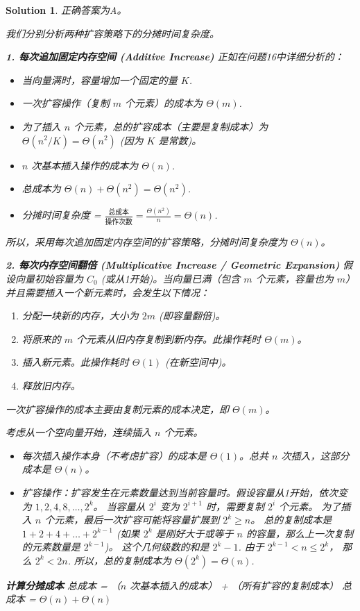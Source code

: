 \documentclass[UTF8]{report}
\newtheorem{solution}{Solution}
\theoremstyle{MyLineTheoremStyle} %
\theoremstyle{MyBlockTheoremStyle} %
\theoremstyle{MySubsubsectionStyle} %
\begin{document}
\begin{solution}
正确答案为A。

我们分别分析两种扩容策略下的分摊时间复杂度。

\textbf{1. 每次追加固定内存空间 (Additive Increase)}
正如在问题16中详细分析的：
\begin{itemize}
    \item 当向量满时，容量增加一个固定的量 $K$.
    \item 一次扩容操作（复制 $m$ 个元素）的成本为 $\Theta(m)$.
    \item 为了插入 $n$ 个元素，总的扩容成本（主要是复制成本）为 $\Theta(n^2/K) = \Theta(n^2)$ (因为 $K$ 是常数)。
    \item $n$ 次基本插入操作的成本为 $\Theta(n)$.
    \item 总成本为 $\Theta(n) + \Theta(n^2) = \Theta(n^2)$.
    \item 分摊时间复杂度 = $\frac{\text{总成本}}{\text{操作次数}} = \frac{\Theta(n^2)}{n} = \Theta(n)$.
\end{itemize}
所以，采用每次追加固定内存空间的扩容策略，分摊时间复杂度为 $\Theta(n)$。

\textbf{2. 每次内存空间翻倍 (Multiplicative Increase / Geometric Expansion)}
假设向量初始容量为 $C_0$ (或从1开始)。当向量已满（包含 $m$ 个元素，容量也为 $m$）并且需要插入一个新元素时，会发生以下情况：
\begin{enumerate}
    \item 分配一块新的内存，大小为 $2m$ (即容量翻倍)。
    \item 将原来的 $m$ 个元素从旧内存复制到新内存。此操作耗时 $\Theta(m)$。
    \item 插入新元素。此操作耗时 $\Theta(1)$ (在新空间中)。
    \item 释放旧内存。
\end{enumerate}
一次扩容操作的成本主要由复制元素的成本决定，即 $\Theta(m)$。

考虑从一个空向量开始，连续插入 $n$ 个元素。
\begin{itemize}
    \item 每次插入操作本身（不考虑扩容）的成本是 $\Theta(1)$。总共 $n$ 次插入，这部分成本是 $\Theta(n)$。
    \item 扩容操作：扩容发生在元素数量达到当前容量时。假设容量从1开始，依次变为 $1, 2, 4, 8, \dots, 2^k$。
    当容量从 $2^i$ 变为 $2^{i+1}$ 时，需要复制 $2^i$ 个元素。
    为了插入 $n$ 个元素，最后一次扩容可能将容量扩展到 $2^k \ge n$。
    总的复制成本是 $1 + 2 + 4 + \dots + 2^{k-1}$ (如果 $2^k$ 是刚好大于或等于 $n$ 的容量，那么上一次复制的元素数量是 $2^{k-1}$)。
    这个几何级数的和是 $2^k - 1$.
    由于 $2^{k-1} < n \le 2^k$， 那么 $2^k < 2n$.
    所以，总的复制成本为 $\Theta(2^k) = \Theta(n)$.
\end{itemize}
\textbf{计算分摊成本}
总成本 = （$n$ 次基本插入的成本） + （所有扩容的复制成本）
总成本 = $\Theta(n) + \Theta(n)$


\end{solution}
\end{document}
